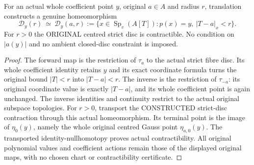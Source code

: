 \begin{theorem}
\label{analytic:actual-centred-strict-fibre-discs}
\leanok
{}
For an actual whole coefficient point $y$, original $a\in A$ and radius $r$,
translation constructs a genuine homeomorphism
\[
 \mathcal D_y(r)\ \simeq\
 \mathcal D_y(a,r):=\{x\in\operatorname{Sp}_v(A[T]):
       p(x)=y,\ |T-a|_x<r\}.
\]
For $r>0$ the ORIGINAL centred strict disc is contractible. No condition
on $|a(y)|$ and no ambient closed-disc constraint is imposed.
\end{theorem}
\begin{proof}
The forward map is the restriction of $\tau_a$ to the actual strict fibre
disc. Its whole coefficient identity retains $y$ and its exact coordinate
formula turns the original bound $|T|<r$ into $|T-a|<r$. The inverse is the
restriction of $\tau_{-a}$: its original coordinate value is exactly
$|T-a|$, and its whole coefficient point is again unchanged. The inverse
identities and continuity restrict to the actual original subspace topologies.
For $r>0$, transport the CONSTRUCTED strict-disc contraction
through this actual homeomorphism. Its terminal point is the image of
$\eta_0(y)$, namely the whole original centred Gauss point
$\eta_{a,0}(y)$. The transported identity-nullhomotopy proves actual
contractibility. All original polynomial values and coefficient actions
remain those of the displayed original maps, with no chosen chart or
contractibility certificate.
\end{proof}
